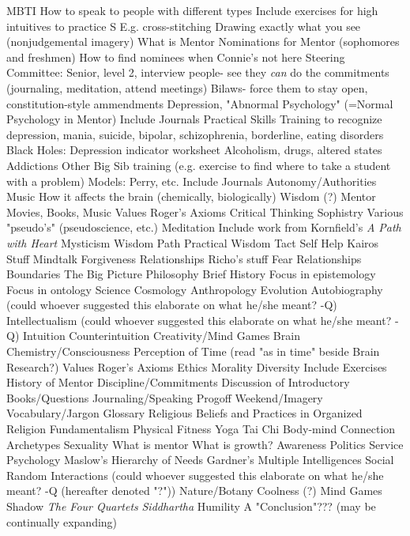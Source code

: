 \documentclass[12pt]{article}
\begin{document}
\begin{outline}[enumerate]
\1 MBTI
	\2 How to speak to people with different types
	\2 Include exercises for high intuitives to practice S
		\3 E.g. cross-stitching
		\3 Drawing exactly what you see (nonjudgemental imagery)
\1 What is Mentor
	\2 Nominations for Mentor (sophomores and freshmen)
	\2 How to find nominees when Connie's not here
	\2 Steering Committee: Senior, level 2, interview people- see they \emph{can} do the commitments (journaling, meditation, attend meetings)
	\2 Bilaws- force them to stay open, constitution-style ammendments
\1 Depression, "Abnormal Psychology" (=Normal Psychology in Mentor)
	\2 Include Journals
	\2 Practical Skills
	\2 Training to recognize depression, mania, suicide, bipolar, schizophrenia, borderline, eating disorders
	\2 Black Holes: Depression indicator worksheet
	\2 Alcoholism, drugs, altered states
	\2 Addictions
	\2 Other Big Sib training (e.g. exercise to find where to take a student with a problem)
\1 Models: Perry, etc.
	\2 Include Journals
	\2 Autonomy/Authorities
\1 Music
	\2 How it affects the brain (chemically, biologically)
	\2 Wisdom (?)
\1 Mentor Movies, Books, Music
\1 Values
	\2 Roger's Axioms
\1 Critical Thinking
	\2 Sophistry
	\2 Various "pseudo's" (pseudoscience, etc.)
\1 Meditation
	\2 Include work from Kornfield's \emph{A Path with Heart}
\1 Mysticism
\1 Wisdom Path
	\2 Practical Wisdom
		\3 Tact
\1 Self Help
	\2 Kairos Stuff
		\3 Mindtalk
		\3 Forgiveness
	\2 Relationships
	\2 Richo's stuff
		\3 Fear
	\2 Relationships
	\2 Boundaries
\1 The Big Picture
	\2 Philosophy
		\3 Brief History
		\3 Focus in epistemology
		\3 Focus in ontology
	\2 Science
		\3 Cosmology
		\3 Anthropology
		\3 Evolution
\1 Autobiography (could whoever suggested this elaborate on what he/she meant? -Q)
\1 Intellectualism (could whoever suggested this elaborate on what he/she meant? -Q)
\1 Intuition
	\2 Counterintuition
\1 Creativity/Mind Games
\1 Brain Chemistry/Consciousness
	\2 Perception of Time (read "as in time" beside Brain Research?)
\1 Values
	\2 Roger's Axioms
	\2 Ethics
	\2 Morality
\1 Diversity
	\2 Include Exercises
\1 History of Mentor
\1 Discipline/Commitments
\1 Discussion of Introductory Books/Questions
\1 Journaling/Speaking
\1 Progoff Weekend/Imagery
\1 Vocabulary/Jargon Glossary
\1 Religious Beliefs and Practices in Organized Religion
	\2 Fundamentalism
\1 Physical Fitness
	\2 Yoga
	\2 Tai Chi
	\2 Body-mind Connection
\1 Archetypes
\1 Sexuality
\1 What is mentor
	\2 What is growth?
\1 Awareness
\1 Politics
\1 Service
\1 Psychology
	\2 Maslow's Hierarchy of Needs
	\2 Gardner's Multiple Intelligences
\1 Social Random Interactions (could whoever suggested this elaborate on what he/she meant? -Q (hereafter denoted "?"))
\1 Nature/Botany
\1 Coolness (?)
\1 Mind Games
\1 Shadow
\1 \emph{The Four Quartets}
\1 \emph{Siddhartha}
\1 Humility
\1 A "Conclusion"??? (may be continually expanding)
\end{outline}
\end{document}
